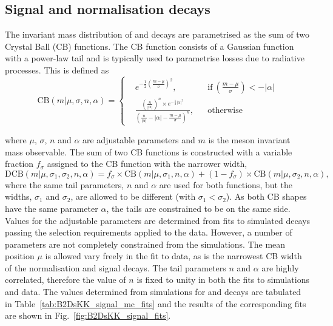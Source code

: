 \subsection{Signal and normalisation decays}
\label{sec:B2DsKK_sigcomps}

The invariant mass distribution of \decay{\Bp}{\Dsp\Dzb} and \decay{\Bp}{\Dsp\Kp\Km} decays are parametrised as the sum of two Crystal Ball (CB) functions.
The CB function consists of a Gaussian function with a power-law tail and is typically used to parametrise losses due to radiative processes.
This is defined as
\begin{equation}
\text{CB}(m|\mu,\sigma,n,\alpha) = \left \{
  \begin{aligned}
    &e^{-\frac{1}{2} \left(\frac{m-\mu}{\sigma}\right)^2}, && \text{if}\ \left(\frac{m-\mu}{\sigma}\right) < -|\alpha|\\
    &\frac{\left(\frac{n}{|\alpha|}\right)^n\times e ^{-\frac{1}{2}|\alpha|^2} }{\left(\frac{n}{|\alpha|}-|\alpha| - \frac{m-\mu}{\sigma}\right)^n}, && \text{otherwise}
  \end{aligned} \right.
\end{equation} 

where $\mu$, $\sigma$, $n$ and $\alpha$ are adjustable parameters and $m$ is the \B meson invariant mass observable.
The sum of two CB functions is constructed with a variable fraction $f_\sigma$ assigned to the CB function with the narrower width,
\begin{equation}
\text{DCB}(m|\mu,\sigma_1,\sigma_2,n,\alpha) = f_\sigma \times \text{CB}(m|\mu,\sigma_1,n,\alpha) + (1-f_\sigma) \times \text{CB}(m|\mu,\sigma_2,n,\alpha),
\label{eq:DoubleBD}
\end{equation}
where the same tail parameters, $n$ and $\alpha$ are used for both functions, but the widths, $\sigma_1$ and $\sigma_2$, are allowed to be different (with $\sigma_1 < \sigma_2$).
As both CB shapes have the same parameter $\alpha$, the tails are constrained to be on the same side.
Values for the adjustable parameters are determined from fits to simulated decays passing the selection requirements applied to the data. 
However, a number of parameters are not completely constrained from the simulations. The mean position $\mu$ is allowed vary freely in the fit to data, as is the narrowest CB width of the normalisation and signal decays. 
The tail parameters $n$ and $\alpha$ are highly correlated, therefore the value of $n$ is fixed to unity in both the fits to simulations and data. The values determined from simulations for \decay{\Bp}{\Dsp\Dzb} and \decay{\Bp}{\Dsp\Kp\Km} decays are tabulated in Table~\ref{tab:B2DsKK_signal_mc_fits} and the results of the corresponding fits are shown in Fig.~\ref{fig:B2DsKK_signal_fits}.


